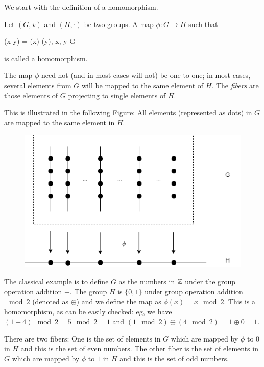 
We start with the definition of a homomorphism.

\begin{definition}
Let $(G,\star)$ and $(H,\cdot)$ be two groups. A map $\phi: G \rightarrow H$ such that

\bee
\phi(x \star y) = \phi(x) \cdot \phi(y), \quad \forall x, y \in G
\eee

is called a homomorphism.

\end{definition}

The map $\phi$ need not (and in most cases will not) be one-to-one; in most cases, several elements from $G$ will be mapped to the same element of $H$. The \emph{fibers} are those elements of $G$ projecting to single elements of $H$.

This is illustrated in the following Figure: All elements (represented as dots) in $G$ are mapped to the same element in $H$.

\begin{figure}[H]
\centering
\includegraphics[scale=0.55]{images/2023-07-17-homomorphism.png}
\end{figure}

The classical example is to define $G$ as the numbers in $\mathbb{Z}$ under the group operation addition $+$. The group $H$ is $\{0, 1\}$ under group operation addition $\mod 2$ (denoted as $\oplus$) and we define the map as $\phi(x) = x \mod 2$. This is a homomorphism, as can be easily checked: eg, we have $(1 + 4) \mod 2 = 5 \mod 2 = 1$ and $(1 \mod 2) \oplus (4 \mod 2) = 1 \oplus 0 = 1$.

 There are two fibers: One is the set of elements in $G$ which are mapped by $\phi$ to $0$ in $H$ and this is the set of even numbers. The other fiber is the set of elements in $G$ which are mapped by $\phi$ to $1$ in $H$ and this is the set of odd numbers.

